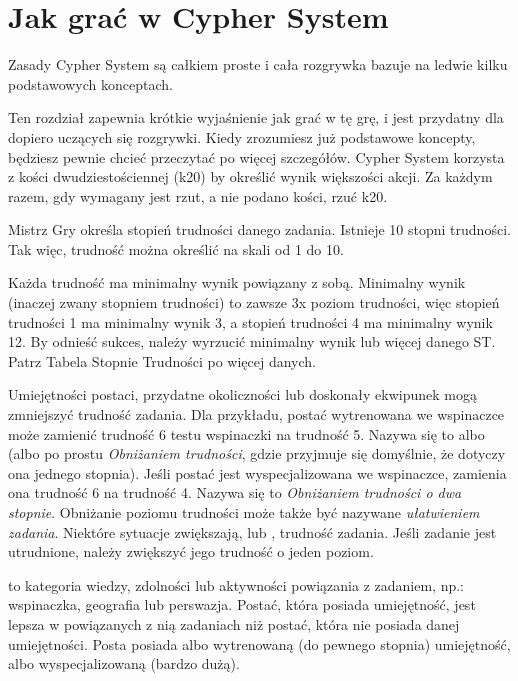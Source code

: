 \chapter {Jak grać w Cypher System}

Zasady Cypher System są całkiem proste i cała rozgrywka bazuje na ledwie kilku podstawowych konceptach.

Ten rozdział zapewnia krótkie wyjaśnienie jak grać w tę grę, i jest przydatny dla dopiero uczących się rozgrywki. Kiedy zrozumiesz już podstawowe koncepty, będziesz pewnie chcieć przeczytać  po więcej szczegółów. 
Cypher System korzysta z kości dwudziestościennej (k20) by określić wynik większości akcji. Za każdym razem, gdy wymagany jest rzut, a nie podano kości, rzuć k20.

Mistrz Gry określa stopień trudności danego zadania. Istnieje 10 stopni trudności. Tak więc, trudność można określić na skali od 1 do 10.

Każda trudność ma minimalny wynik powiązany z sobą. Minimalny wynik (inaczej zwany stopniem trudności) to zawsze 3x poziom trudności, więc stopień trudności 1 ma minimalny wynik 3, a stopień trudności 4 ma minimalny wynik 12. By odnieść sukces, należy wyrzucić minimalny wynik lub więcej danego ST. Patrz Tabela Stopnie Trudności po więcej danych.

Umiejętności postaci, przydatne okoliczności lub doskonały ekwipunek mogą zmniejszyć trudność zadania. Dla przykładu, postać wytrenowana we wspinaczce może zamienić trudność 6 testu wspinaczki na trudność 5. Nazywa się to   albo  (albo po prostu \textit{Obniżaniem trudności}, gdzie przyjmuje się domyślnie, że dotyczy ona jednego stopnia). Jeśli postać jest wyspecjalizowana we wspinaczce, zamienia ona trudność 6 na trudność 4. Nazywa się to \textit{Obniżaniem trudności o dwa stopnie}. Obniżanie poziomu trudności może także być nazywane \textit{ułatwieniem zadania}. Niektóre sytuacje zwiększają, lub , trudność zadania. Jeśli zadanie jest utrudnione, należy zwiększyć jego trudność o jeden poziom.

 to kategoria wiedzy, zdolności lub aktywności powiązania z zadaniem, np.: wspinaczka, geografia lub perswazja. Postać, która posiada umiejętność, jest lepsza w powiązanych z nią zadaniach niż postać, która nie posiada danej umiejętności. Posta posiada albo wytrenowaną (do pewnego stopnia) umiejętność, albo wyspecjalizowaną (bardzo dużą).

